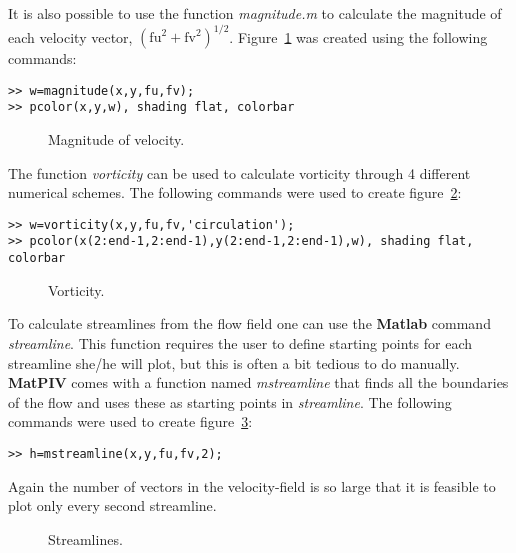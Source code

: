 \documentclass{book}
\begin{document}
It is also possible to use the function {\em magnitude.m} to calculate
the magnitude of each velocity vector,
$(\mbox{fu}^2+\mbox{fv}^2)^{1/2}$. Figure~\ref{fig:magn} was created
using the following commands:
\begin{verbatim}
>> w=magnitude(x,y,fu,fv);
>> pcolor(x,y,w), shading flat, colorbar
\end{verbatim}

\begin{figure}
\begin{center} 
{}
\end{center}
\caption{Magnitude of velocity.}\label{fig:magn}
\end{figure}

The function {\em vorticity} can be used to calculate vorticity
through 4 different numerical schemes. The following commands were
used to create figure~\ref{fig:vort}:

\begin{verbatim}
>> w=vorticity(x,y,fu,fv,'circulation');
>> pcolor(x(2:end-1,2:end-1),y(2:end-1,2:end-1),w), shading flat, colorbar
\end{verbatim}

\begin{figure}
\begin{center} 
{}
\end{center}
\caption{Vorticity.}\label{fig:vort}
\end{figure}

To calculate streamlines from the flow field one can use the {\bf
Matlab} command {\em streamline}. This function requires the user to
define starting points for each streamline she/he will plot, but this
is often a bit tedious to do manually. {\bf MatPIV} comes with a
function named {\em mstreamline} that finds all the boundaries of the
flow and uses these as starting points in {\em streamline}. The
following commands were used to create figure~\ref{fig:streaml}:
\begin{verbatim}
>> h=mstreamline(x,y,fu,fv,2);
\end{verbatim}
Again the number of vectors in the velocity-field is so large that it
is feasible to plot only every second streamline.
\begin{figure}
\begin{center} 
{}
\end{center}
\caption{Streamlines.}\label{fig:streaml}
\end{figure}
\end{document}
